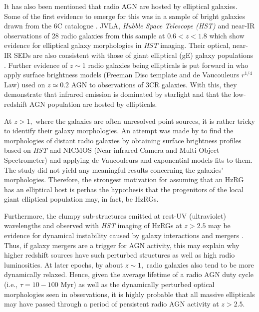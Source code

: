 It has also been mentioned that radio AGN are hosted by elliptical galaxies. Some of the first evidence to emerge for this was in a sample of bright galaxies drawn from the 6C catalogue \citep{Eales1985a,Eales1985b}. JVLA, {\it Hubble Space Telescope (HST)} and near-IR observations of 28 radio galaxies from this sample at $0.6 < z < 1.8$ which show evidence for elliptical galaxy morphologies in {\it HST} imaging. Their optical, near-IR SEDs are also consistent with those of giant elliptical (gE) galaxy populations \citep{Best1997}. Further evidence of $z \sim 1$ radio galaxies being ellipticals is put forward in \citet{McLureDunlop2000} who apply surface brightness models (Freeman Disc template and de Vaucouleurs $r^{1/4}$ Law) used on $z \simeq 0.2$ AGN to observations of 3CR galaxies. With this, they demonstrate that infrared emission is dominated by starlight and that the low-redshift AGN population are hosted by ellipticals. 

At $z > 1,$ where the galaxies are often unresolved point sources, it is rather tricky to identify their galaxy morphologies. An attempt was made by \citet{pentericci2001} to find the morphologies of distant radio galaxies by obtaining surface brightness profiles based on {\it HST} and NICMOS (Near infrared Camera and Multi-Object Spectrometer) and applying de Vaucouleurs and exponential models fits to them. The study did not yield any meaningful results concerning the galaxies' morphologies. Therefore, the strongest motivation for assuming that an HzRG has an elliptical host is perhas the hypothesis that the progenitors of the local giant elliptical population may, in fact, be HzRGs. 

Furthermore, the clumpy sub-structures emitted at rest-UV (ultraviolet) wavelengths and observed with {\it HST} imaging of HzRGs at $z > 2.5$ may be evidence for dynamical instability caused by galaxy interactions and mergers \citep{pentericci2001}. Thus, if galaxy mergers are a trigger for AGN activity, this may explain why higher redshift sources have such perturbed structures as well as high radio luminosities. At later epochs, by about $z \sim 1,$ radio galaxies also tend to be more dynamically relaxed. Hence, given the average lifetime of a radio AGN duty cycle (i.e., $\tau=10-100$ Myr) as well as the dynamically perturbed optical morphologies seen in observations, it is highly probable that all massive ellipticals may have passed through a period of persistent radio AGN activity at $z > 2.5.$ 

